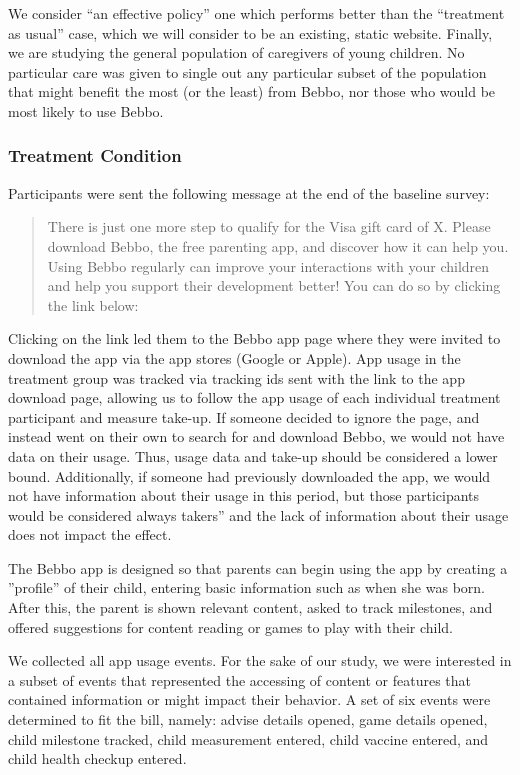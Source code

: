 We consider “an effective policy” one which performs better than the “treatment as usual” case, which we will consider to be an existing, static website. Finally, we are studying the general population of caregivers of young children. No particular care was given to single out any particular subset of the population that might benefit the most (or the least) from Bebbo, nor those who would be most likely to use Bebbo.




\subsubsection*{Treatment Condition}
Participants were sent the following message at the end of the baseline survey:

\begin{quote}
There is just one more step to qualify for the Visa gift card of X. Please download Bebbo, the free parenting app, and discover how it can help you. Using Bebbo regularly can improve your interactions with your children and help you support their development better! You can do so by clicking the link below:
\end{quote}

Clicking on the link led them to the Bebbo app page where they were invited to download the app via the app stores (Google or Apple). App usage in the treatment group was tracked via tracking ids sent with the link to the app download page, allowing us to follow the app usage of each individual treatment participant and measure take-up. If someone decided to ignore the page, and instead went on their own to search for and download Bebbo, we would not have data on their usage. Thus, usage data and take-up should be considered a lower bound. Additionally, if someone had previously downloaded the app, we would not have information about their usage in this period, but those participants would be considered always takers” and the lack of information about their usage does not impact the effect.

The Bebbo app is designed so that parents can begin using the app by creating a ”profile” of their child, entering basic information such as when she was born. After this, the parent is shown relevant content, asked to track milestones, and offered suggestions for content reading or games to play with their child.

We collected all app usage events. For the sake of our study, we were interested in a subset of events that represented the accessing of content or features that contained information or might impact their behavior. A set of six events were determined to fit the bill, namely: advise details opened, game details opened, child milestone tracked, child measurement entered, child vaccine entered, and child health checkup entered.

